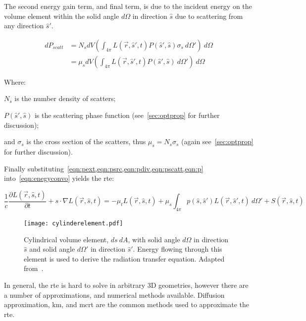The second energy gain term, and final term, is due to the incident energy on the volume element within the solid angle $d\Omega$ in direction $\hat{s}$ due to scattering from any direction $\hat{s}'$.

\begin{align}
	dP_{scatt}&=N_sdV\left(\int_{4\pi}L(\vec{r},\hat{s}',t)P(\hat{s}',\hat{s})\sigma_s\ d\Omega' \right)\ d\Omega \\
			  &=\mu_sdV\left(\int_{4\pi}L(\vec{r},\hat{s}',t)P(\hat{s}',\hat{s})\ d\Omega' \right)\ d\Omega 
			  \label{eqn:pscatt}
\end{align}

\noindent Where:

\indent $N_s$ is the number density of scatters;

\indent $P(\hat{s}',\hat{s})$ is the scattering phase function (see~\cref{sec:optprop} for further discussion);

\indent and $\sigma_s$ is the cross section of the scatters, thus $\mu_s=N_s\sigma_s$ (again see~\cref{sec:optprop} for further discussion).

\medskip


Finally substituting~\cref{eqn:pext,eqn:psrc,eqn:pdiv,eqn:pscatt,eqn:p} into~\cref{eqn:enegyconvo} yields the \gls*{rte}:

\begin{equation}
\frac{1}{c}\frac{\partial L(\vec{r},\hat{s},t)}{\partial t} + s\cdot \nabla L(\vec{r},\hat{s},t)=-\mu_tL(\vec{r},\hat{s},t)+\mu_s\int_{4\pi}p(\hat{s},\hat{s}')L(\vec{r},\hat{s}',t)\ d\Omega' + S(\vec{r},\hat{s},t)
\label{eqn:rte}
\end{equation}

\begin{figure}[!htb]
	\centering
	\texttt{[image: cylinderelement.pdf]}
	\caption{Cylindrical volume element, $ds\ dA$, with solid angle $d\Omega$ in direction $\hat{s}$ and solid angle $d\Omega'$ in direction $\hat{s}'$. Energy flowing through this element is used to derive the radiation transfer equation. Adapted from~\cite{wang2012biomedical,chandrasekhar2013radiative}.}
	\label{fig:energydiag2}
\end{figure}

In general, the \gls*{rte} is hard to solve in arbitrary 3D geometries, however there are a number of approximations, and numerical methods available. Diffusion approximation, \gls*{km}, and \gls*{mcrt} are the common methods used to approximate the \gls*{rte}.

